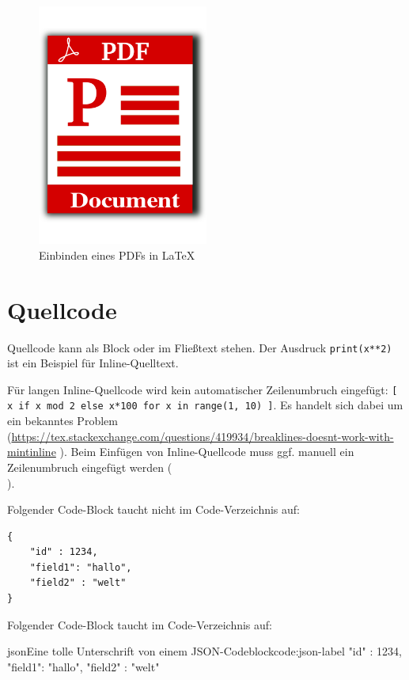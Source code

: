 \begin{figure}[h!]
    \centering
    \includegraphics[width=0.5\textwidth]{img/Example.pdf}
    \caption[Beispiel für PDF-Einbindung]{Einbinden eines PDFs in LaTeX}
    \label{fig_example_pdf}
\end{figure}

\section{Quellcode}
Quellcode kann als Block oder im Fließtext stehen. Der Ausdruck \texttt{print(x**2)} ist ein Beispiel für Inline-Quelltext.

Für langen Inline-Quellcode wird kein automatischer Zeilenumbruch eingefügt: \texttt{[ x if x mod 2 else x*100 for x in range(1, 10) ]}.
Es handelt sich dabei um ein bekanntes Problem (\url{https://tex.stackexchange.com/questions/419934/breaklines-doesnt-work-with-mintinline} ). Beim Einfügen von Inline-Quellcode muss ggf. manuell ein Zeilenumbruch eingefügt werden (\texttt{\\}).

Folgender Code-Block taucht nicht im Code-Verzeichnis auf:
\begin{verbatim}
{   
    "id" : 1234,  
    "field1": "hallo",  
    "field2" : "welt"
}
\end{verbatim}

Folgender Code-Block taucht im Code-Verzeichnis auf: \\
\begin{code}{json}{Eine tolle Unterschrift von einem JSON-Codeblock}{code:json-label}
{   
    "id" : 1234,
    "field1": "hallo",
    "field2" : "welt"
}
\end{code}

